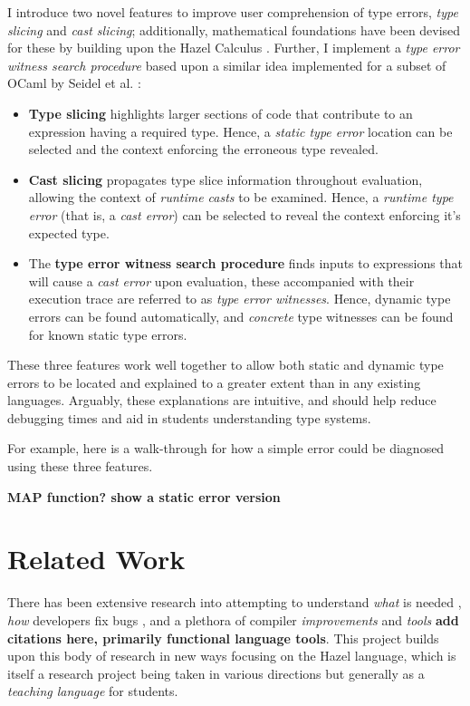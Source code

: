 I introduce two novel features to improve user comprehension of type errors, \textit{type slicing} and \textit{cast slicing}; additionally, mathematical foundations have been devised for these by building upon the Hazel Calculus \cite{HazelLivePaper}. Further, I implement a \textit{type error witness search procedure} based upon a similar idea implemented for a subset of OCaml by Seidel et al. \cite{SearchProc}:
\begin{itemize}
\item \textbf{Type slicing} highlights larger sections of code that contribute to an expression having a required type. Hence, a \textit{static type error} location can be selected and the context enforcing the erroneous type revealed.

\item \textbf{Cast slicing} propagates type slice information throughout evaluation, allowing the context of \textit{runtime casts} to be examined. Hence, a \textit{runtime type error} (that is, a \textit{cast error}) can be selected to reveal the context enforcing it's expected type.

\item The \textbf{type error witness search procedure} finds inputs to expressions that will cause a \textit{cast error} upon evaluation, these accompanied with their execution trace are referred to as \textit{type error witnesses}. Hence, dynamic type errors can be found automatically, and \textit{concrete} type witnesses can be found for known static type errors.
\end{itemize}

These three features work well together to allow both static and dynamic type errors to be located and explained to a greater extent than in any existing languages. Arguably, these explanations are intuitive, and should help reduce debugging times and aid in students understanding type systems.

For example, here is a walk-through for how a simple error could be diagnosed using these three features. 

\textbf{MAP function? show a static error version}

\section{Related Work}
\label{sec:RelatedWork}
There has been extensive research into attempting to understand \textit{what} is needed \cite{DebugNeeds}, \textit{how} developers fix bugs \cite{HowFixBugs}, and a plethora of compiler \textit{improvements} and \textit{tools} \textbf{add citations here, primarily functional language tools}. This project builds upon this body of research in new ways focusing on the Hazel language, which is itself a research project being taken in various directions but generally as a \textit{teaching language} for students. 

